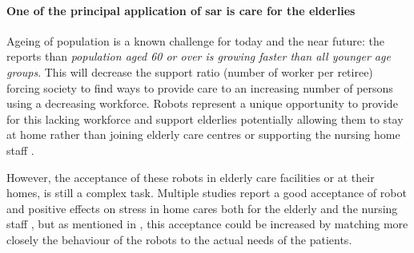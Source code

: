 	\paragraph{One of the principal application of \gls{sar} is care for the elderlies}
	Ageing of population is a known challenge for today and the near future: the \cite{united2017world} reports than \emph{population aged 60 or over is growing faster than all younger age groups}. This will decrease the support ratio (number of worker per retiree) forcing society to find ways to provide care to an increasing number of persons using a decreasing workforce. Robots represent a unique opportunity to provide for this lacking workforce and support elderlies potentially allowing them to stay at home rather than joining elderly care centres \citep{di2014web} or supporting the nursing home staff \citep{wada2004effects}.
	
	
    However, the acceptance of these robots in elderly care facilities or at
    their homes, is still a complex task. Multiple studies report a good
    acceptance of robot and positive effects on stress in home cares both for
    the elderly and the nursing staff \citep{wada2004effects}, but as mentioned
    in \citep{broadbent2009acceptance}, this acceptance could be increased by
    matching more closely the behaviour of the robots to the actual needs of the
    patients.	
		

